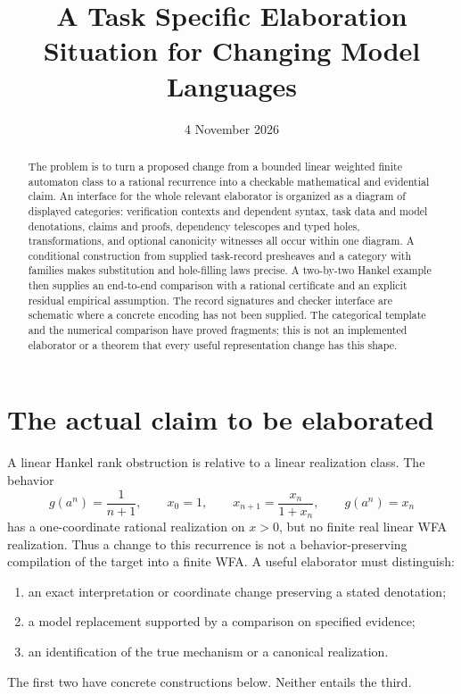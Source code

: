 \documentclass[11pt]{article}
\title{A Task Specific Elaboration Situation for Changing Model Languages}
\author{}
\date{4 November 2026}
\begin{document}
\maketitle

\begin{abstract}
The problem is to turn a proposed change from a bounded linear weighted
finite automaton class to a rational recurrence into a checkable mathematical
and evidential claim. An interface for the whole relevant elaborator is organized as a diagram
of displayed categories: verification contexts and dependent syntax, task
data and model denotations, claims and proofs, dependency telescopes and typed
holes, transformations, and optional canonicity witnesses all occur within
one diagram. A conditional construction from supplied task-record presheaves and a
category with families makes substitution and hole-filling laws precise. A two-by-two Hankel example
then supplies an end-to-end comparison with a rational certificate and
an explicit residual empirical assumption. The record signatures and checker interface are schematic where a concrete
encoding has not been supplied. The categorical template and the numerical
comparison have proved fragments; this is not an implemented elaborator
or a theorem that every useful representation change has this shape.
\end{abstract}

\section{The actual claim to be elaborated}

A linear Hankel rank obstruction is relative to a linear realization class.
The behavior
\[
 g(a^n)=\frac1{n+1},\qquad x_0=1,\qquad
 x_{n+1}=\frac{x_n}{1+x_n},\qquad g(a^n)=x_n
\]
has a one-coordinate rational realization on $x>0$, but no finite real
linear WFA realization. Thus a change to this recurrence is not a
behavior-preserving compilation of the target into a finite WFA. A useful
elaborator must distinguish:
\begin{enumerate}
\item an exact interpretation or coordinate change preserving a stated
      denotation;
\item a model replacement supported by a comparison on specified evidence;
\item an identification of the true mechanism or a canonical realization.
\end{enumerate}
The first two have concrete constructions below. Neither entails the third.
\end{document}
